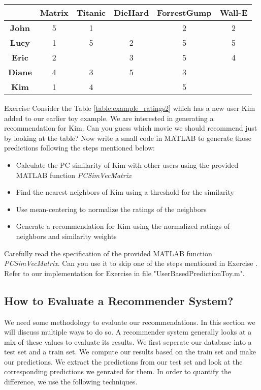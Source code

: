 \begin{table*}
\centering
\begin{tabular}{|c|c|c|c|c|c|}
\hline
\textbf{} 			& \textbf{Matrix} & \textbf{Titanic} & \textbf{DieHard} & \textbf{ForrestGump} & \textbf{Wall-E}\\ 
\hline
\textbf{John} 		& 	 	5		  & 		1		 & 				    &   	2			   & 		2		\\ 
\hline
\textbf{Lucy} 		& 	 	1		  & 		5		 & 		2		    &   	5			   & 		5		\\ 
\hline
\textbf{Eric} 		& 	 	2		  & 				 & 		3		    &   	5			   & 		4		\\ 
\hline
\textbf{Diane} 		& 	 	4		  & 		3		 & 		5		    &   	3			   & 				\\ 
\hline
\textbf{Kim} 		& 	 	1		  & 		4		 & 				    &   	5			   & 				\\ 
\hline
\end{tabular}
\caption{Example ratings}
\label{table:example_ratings2}
\end{table*}

\begin{myremark}{Exercise }
Consider the Table \ref{table:example_ratings2} which has a new user Kim added to our earlier toy example. We are interested in generating a recommendation for Kim. Can you guess which movie we should recommend just by looking at the table? Now write a small code in MATLAB to generate those predictions following the steps mentioned below:
\begin{itemize}
\item{}Calculate the PC similarity of Kim with other users using the provided MATLAB function \textit{PCSimVecMatrix}
\item{}Find the nearest neighbors of Kim using a threshold for the similarity
\item{}Use mean-centering to normalize the ratings of the neighbors 
\item{}Generate a recommendation for Kim using the normalized ratings of neighbors and similarity weights
\end{itemize}
\end{myremark}
Carefully read the specification of the provided MATLAB function \textit{PCSimVecMatrix}. Can you use it to skip one of the steps mentioned in Exercise . Refer to our implementation for Exercise  in file "UserBasedPredictionToy.m".
\subsection{How to Evaluate a Recommender System?}
We need some methodology to evaluate our recommendations. In this section we will discuss multiple ways to do so. A recommender system generally looks at a mix of these values to evaluate its results. We first seperate our database into a test set and a train set. We compute our results based on the train set and make our predictions. We extract the predictions from our test set and look at the corresponding predictions we genrated for them. In order to quantify the difference, we use the following techniques.

